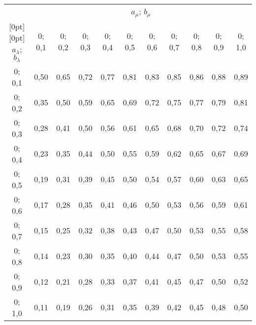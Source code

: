 \begin{table}\small
\begin{center}
\vspace*{2ex}

\begin{tabular}{|c|c|c|c|c|c|c|c|c|c|c|}
\hline
&\multicolumn{10}{c|}{$a_{\mu}$; $b_{\mu}$}\\
\cline{2-11}
\multicolumn{1}{|c|}{\raisebox{6pt}[0pt][0pt]{$a_{\lambda}$; $b_{\lambda}$}}
& 0;  0,1& 0;  0,2& 0;  0,3& 0;  0,4& 0;  0,5& 0;  0,6& 0;  0,7& 0;  0,8& 0;  0,9& 0;  1,0\\
\hline
 0;  0,1& 0,50& 0,65& 0,72& 0,77& 0,81& 0,83& 0,85& 0,86& 0,88& 0,89\\
 0;  0,2& 0,35& 0,50& 0,59& 0,65& 0,69& 0,72& 0,75& 0,77& 0,79& 0,81\\
 0;  0,3& 0,28& 0,41& 0,50& 0,56& 0,61& 0,65& 0,68& 0,70& 0,72& 0,74\\
 0;  0,4& 0,23& 0,35& 0,44& 0,50& 0,55& 0,59& 0,62& 0,65& 0,67& 0,69\\
 0;  0,5& 0,19& 0,31& 0,39& 0,45& 0,50& 0,54& 0,57& 0,60& 0,63& 0,65\\
 0;  0,6& 0,17& 0,28& 0,35& 0,41& 0,46& 0,50& 0,53& 0,56& 0,59& 0,61\\
 0;  0,7& 0,15& 0,25& 0,32& 0,38& 0,43& 0,47& 0,50& 0,53& 0,55& 0,58\\
 0;  0,8& 0,14& 0,23& 0,30& 0,35& 0,40& 0,44& 0,47& 0,50& 0,53& 0,55\\
 0;  0,9& 0,12& 0,21& 0,28& 0,33& 0,37& 0,41& 0,45& 0,47& 0,50& 0,52\\
 0;  1,0& 0,11& 0,19& 0,26& 0,31& 0,35& 0,39& 0,42& 0,45& 0,48& 0,50\\
\hline
\end{tabular}
\end{center}
\end{table}

